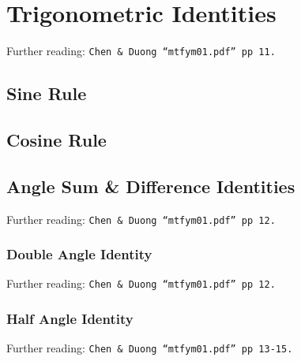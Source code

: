 \section{Trigonometric Identities}
\label{sec:TR Trigonometric Identities}
Further reading: \texttt{Chen \& Duong ``mtfym01.pdf'' pp 11.}

\subsection{Sine Rule}
\label{subsec:TR Trigonometric Identities - Sine Rule}

\subsection{Cosine Rule}
\label{subsec:TR Trigonometric Identities - Cosine Rule}

\subsection{Angle Sum \& Difference Identities}
\label{subsec:TR Trigonometric Identities - Angle Sum Identities}
Further reading: \texttt{Chen \& Duong ``mtfym01.pdf'' pp 12.}

\subsubsection{Double Angle Identity}
\label{subsubsec:TR Trigonometric Identities - Angle Sum Identities - Double Angle Identity}
Further reading: \texttt{Chen \& Duong ``mtfym01.pdf'' pp 12.}

\subsubsection{Half Angle Identity}
\label{subsubsec:TR Trigonometric Identities - Angle Sum Identities - Half Angle Identity}
Further reading: \texttt{Chen \& Duong ``mtfym01.pdf'' pp 13-15.}